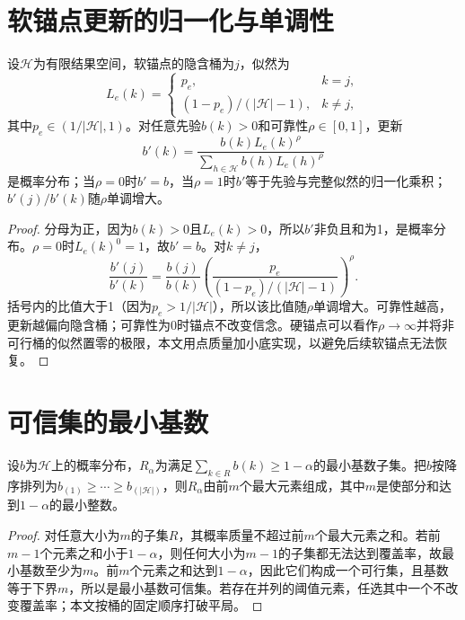 \section{软锚点更新的归一化与单调性}

\begin{proposition}
设$\mathcal H$为有限结果空间，软锚点的隐含桶为$j$，似然为
\[
L_e(k)=
\begin{cases}
p_e, & k=j,\\
(1-p_e)/(|\mathcal H|-1), & k\ne j,
\end{cases}
\]
其中$p_e\in(1/|\mathcal H|,1)$。对任意先验$b(k)>0$和可靠性$\rho\in[0,1]$，更新
\[
b'(k)=\frac{b(k)L_e(k)^\rho}{\sum_{h\in\mathcal H}b(h)L_e(h)^\rho}
\]
是概率分布；当$\rho=0$时$b'=b$，当$\rho=1$时$b'$等于先验与完整似然的归一化乘积；$b'(j)/b'(k)$随$\rho$单调增大。
\end{proposition}

\begin{proof}
分母为正，因为$b(k)>0$且$L_e(k)>0$，所以$b'$非负且和为1，是概率分布。$\rho=0$时$L_e(k)^0=1$，故$b'=b$。对$k\ne j$，
\[
\frac{b'(j)}{b'(k)}
=\frac{b(j)}{b(k)}
\left(\frac{p_e}{(1-p_e)/(|\mathcal H|-1)}\right)^\rho.
\]
括号内的比值大于1（因为$p_e>1/|\mathcal H|$），所以该比值随$\rho$单调增大。可靠性越高，更新越偏向隐含桶；可靠性为0时锚点不改变信念。硬锚点可以看作$\rho\to\infty$并将非可行桶的似然置零的极限，本文用点质量加小底实现，以避免后续软锚点无法恢复。
\end{proof}

\section{可信集的最小基数}

\begin{proposition}
设$b$为$\mathcal H$上的概率分布，$R_\alpha$为满足$\sum_{k\in R}b(k)\ge 1-\alpha$的最小基数子集。把$b$按降序排列为$b_{(1)}\ge\cdots\ge b_{(|\mathcal H|)}$，则$R_\alpha$由前$m$个最大元素组成，其中$m$是使部分和达到$1-\alpha$的最小整数。
\end{proposition}

\begin{proof}
对任意大小为$m$的子集$R$，其概率质量不超过前$m$个最大元素之和。若前$m-1$个元素之和小于$1-\alpha$，则任何大小为$m-1$的子集都无法达到覆盖率，故最小基数至少为$m$。前$m$个元素之和达到$1-\alpha$，因此它们构成一个可行集，且基数等于下界$m$，所以是最小基数可信集。若存在并列的阈值元素，任选其中一个不改变覆盖率；本文按桶的固定顺序打破平局。
\end{proof}

